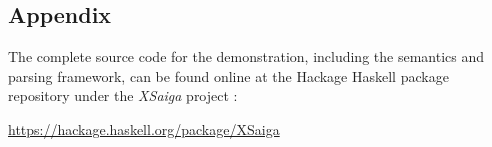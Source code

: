 \documentclass[../main.tex]{subfiles}
\begin{document}
\begin{refsection}
\section*{Appendix}

\noindent The complete source code for the demonstration, including the semantics and parsing framework, can be found online at the Hackage Haskell package repository under the \textit{XSaiga} project \cite{xsaiga}:

\begin{center}
	\url{https://hackage.haskell.org/package/XSaiga}
\end{center}

\printbibliography[heading=subbibintoc]

\end{refsection}
\end{document}
